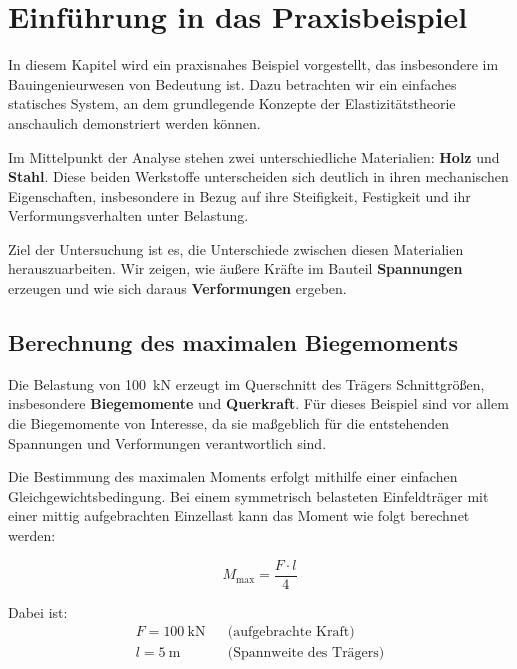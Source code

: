 %
%
%
%
\usepackage{siunitx}
\usepackage{amsmath}
\usepackage[ngerman]{babel}



\section*{Einführung in das Praxisbeispiel}

In diesem Kapitel wird ein praxisnahes Beispiel vorgestellt, das insbesondere im Bauingenieurwesen von Bedeutung ist. Dazu betrachten wir ein einfaches statisches System, an dem grundlegende Konzepte der Elastizitätstheorie anschaulich demonstriert werden können.

Im Mittelpunkt der Analyse stehen zwei unterschiedliche Materialien: \textbf{Holz} und \textbf{Stahl}. Diese beiden Werkstoffe unterscheiden sich deutlich in ihren mechanischen Eigenschaften, insbesondere in Bezug auf ihre Steifigkeit, Festigkeit und ihr Verformungsverhalten unter Belastung.

Ziel der Untersuchung ist es, die Unterschiede zwischen diesen Materialien herauszuarbeiten. Wir zeigen, wie äußere Kräfte im Bauteil \textbf{Spannungen} erzeugen und wie sich daraus \textbf{Verformungen} ergeben.

\subsection*{Berechnung des maximalen Biegemoments}

Die Belastung von \SI{100}{\kilo\newton} erzeugt im Querschnitt des Trägers Schnittgrößen, insbesondere \textbf{Biegemomente} und \textbf{Querkraft}. Für dieses Beispiel sind vor allem die Biegemomente von Interesse, da sie maßgeblich für die entstehenden Spannungen und Verformungen verantwortlich sind.

Die Bestimmung des maximalen Moments erfolgt mithilfe einer einfachen Gleichgewichtsbedingung. Bei einem symmetrisch belasteten Einfeldträger mit einer mittig aufgebrachten Einzellast kann das Moment wie folgt berechnet werden:

\[
M_\text{max} = \frac{F \cdot l}{4}
\]

Dabei ist:
\begin{align}
F = \SI{100}{\kilo\newton} && \text{(aufgebrachte Kraft)} \\
l = \SI{5}{\meter} && \text{(Spannweite des Trägers)}
\end{align}

